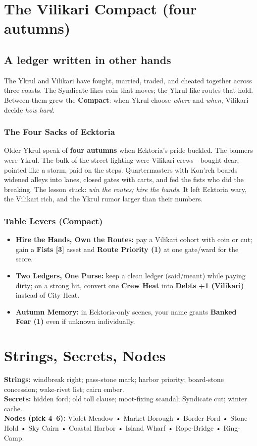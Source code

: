 \documentclass[11pt,letterpaper]{article}
\begin{document}
\section{The Vilikari Compact (four autumns)}
\subsection*{A ledger written in other hands}
The Ykrul and Vilikari have fought, married, traded, and cheated together across three coasts. The Syndicate likes coin that moves; the Ykrul like routes that hold. Between them grew the \textbf{Compact}: when Ykrul choose \emph{where} and \emph{when}, Vilikari decide \emph{how hard}.

\subsubsection*{The Four Sacks of Ecktoria}
Older Ykrul speak of \textbf{four autumns} when Ecktoria's pride buckled. The banners were Ykrul. The bulk of the street-fighting were Vilikari crews---bought dear, pointed like a storm, paid on the steps. Quartermasters with Kon'reh boards widened alleys into lanes, closed gates with carts, and fed the fists who did the breaking. The lesson stuck: \emph{win the routes; hire the hands}. It left Ecktoria wary, the Vilikari rich, and the Ykrul rumor larger than their numbers.

\subsubsection*{Table Levers (Compact)}
\begin{itemize}[leftmargin=*]
  \item \textbf{Hire the Hands, Own the Routes:} pay a Vilikari cohort with coin or cut; gain a \textbf{Fists [3]} asset and \textbf{Route Priority (1)} at one gate/ward for the score.
  \item \textbf{Two Ledgers, One Purse:} keep a clean ledger (said/meant) while paying dirty; on a strong hit, convert one \textbf{Crew Heat} into \textbf{Debts +1 (Vilikari)} instead of City Heat.
  \item \textbf{Autumn Memory:} in Ecktoria-only scenes, your name grants \textbf{Banked Fear (1)} even if unknown individually.
\end{itemize}

\section{Strings, Secrets, Nodes}
\textbf{Strings:} windbreak right; pass-stone mark; harbor priority; board-stone concession; wake-rivet list; cairn ember.\\
\textbf{Secrets:} hidden ford; old toll clause; moot-fixing scandal; Syndicate cut; winter cache.\\
\textbf{Nodes (pick 4--6):} Violet Meadow • Market Borough • Border Ford • Stone Hold • Sky Cairn • Coastal Harbor • Island Wharf • Rope-Bridge • Ring-Camp.
\end{document}

